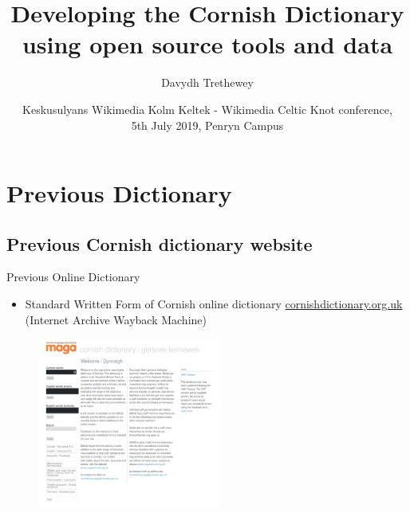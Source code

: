 \documentclass{beamer}
\title %
[Developing the Cornish Dictionary]
{Developing the Cornish Dictionary using open source tools and data}
\author %
{Davydh Trethewey}%
\institute %
{Project Support Assistant, Sodhva Kernewek - Cornish Language Office \\ 
Konsel Kernow - Cornwall Council \\
davidtreth@gmail.com \\ \href{https://taklowkernewek.neocities.org}{taklowkernewek.neocities.org}}
\date[WikiCelticKnot2019] %
{Keskusulyans Wikimedia Kolm Keltek - Wikimedia Celtic Knot conference,\\ 5th July 2019, Penryn Campus}
\begin{document}
\begin{frame}
  \titlepage
{}  
\end{frame}
\section{Previous Dictionary}
\subsection{Previous Cornish dictionary website}
\begin{frame}{Previous Online Dictionary}
  \begin{itemize}  
  \item Standard Written Form of Cornish online dictionary \href{https://web.archive.org/web/20190324085922/http://www.cornishdictionary.org.uk/cornish/alpha}{cornishdictionary.org.uk} (Internet Archive Wayback Machine)
  \end{itemize}
  \begin{figure}
 \begin{center}
\includegraphics[width=6cm]{cornishdictionarywebsite.png}
 \end{center}
 \caption{}
 \label{fig:SWFdict_screenshot}
\end{figure}
\end{frame}
\end{document}
